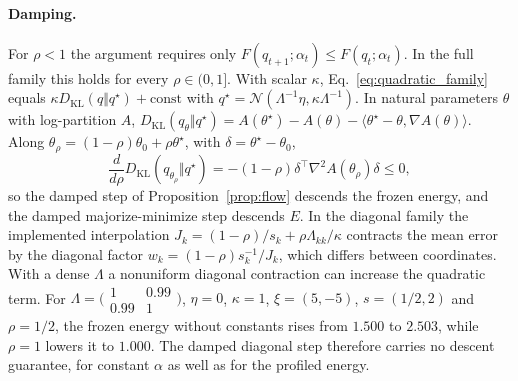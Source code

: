 \documentclass[11pt]{article}
\theoremstyle{definition}
\theoremstyle{remark}
\newcommand{\KL}{D_{\mathrm{KL}}}
\newcommand{\N}{\mathcal{N}}
\begin{document}
\paragraph{Damping.}
For $\rho<1$ the argument requires only $F(q_{t+1};\alpha_t)\le F(q_t;\alpha_t)$. In the full family this holds for every $\rho\in(0,1]$. With scalar $\kappa$, Eq.~\eqref{eq:quadratic_family} equals $\kappa\KL(q\Vert q^\star)+\text{const}$ with $q^\star=\N(\Lambda^{-1}\eta,\kappa\Lambda^{-1})$. In natural parameters $\theta$ with log-partition $A$, $\KL(q_\theta\Vert q^\star)=A(\theta^\star)-A(\theta)-\langle\theta^\star-\theta,\nabla A(\theta)\rangle$. Along $\theta_\rho=(1-\rho)\theta_0+\rho\theta^\star$, with $\delta=\theta^\star-\theta_0$,
\begin{equation}
\frac{d}{d\rho}\KL(q_{\theta_\rho}\Vert q^\star)=-(1-\rho)\delta^\top\nabla^2A(\theta_\rho)\delta\le0,
\end{equation}
so the damped step of Proposition~\ref{prop:flow} descends the frozen energy, and the damped majorize-minimize step descends $E$. In the diagonal family the implemented interpolation $J_k=(1-\rho)/s_k+\rho\Lambda_{kk}/\kappa$ contracts the mean error by the diagonal factor $w_k=(1-\rho)s_k^{-1}/J_k$, which differs between coordinates. With a dense $\Lambda$ a nonuniform diagonal contraction can increase the quadratic term. For $\Lambda=\bigl(\begin{smallmatrix}1&0.99\\0.99&1\end{smallmatrix}\bigr)$, $\eta=0$, $\kappa=1$, $\xi=(5,-5)$, $s=(1/2,2)$ and $\rho=1/2$, the frozen energy without constants rises from $1.500$ to $2.503$, while $\rho=1$ lowers it to $1.000$. The damped diagonal step therefore carries no descent guarantee, for constant $\alpha$ as well as for the profiled energy.
\end{document}
